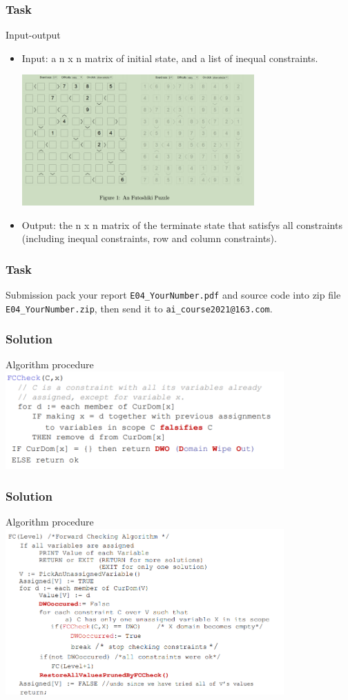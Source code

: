\documentclass{beamer}
\begin{document}
\begin{frame}
  \frametitle{Task}
  \begin{block}{Input-output}
    \begin{itemize}
      \item Input: a n x n matrix of initial state, and a list of inequal constraints.


	  \includegraphics[width=0.7\textwidth]{Pic/figure1}

      \item Output: the n x n matrix of the terminate state that satisfys all constraints (including inequal constraints, row and column constraints).
    \end{itemize}
  \end{block}
\end{frame}
\begin{frame}

  \frametitle{Task}
  \begin{block}{Submission}
    pack your report \texttt{E04\_YourNumber.pdf} and source code into zip file \texttt{E04\_YourNumber.zip}, then send it to \texttt{ai\_course2021@163.com}.
  \end{block}
\end{frame}

\begin{frame}
  \frametitle{Solution}
  Algorithm procedure
  \includegraphics[width=0.8\textwidth]{Pic/fc1}
\end{frame}

\begin{frame}
  \frametitle{Solution}
  Algorithm procedure
  \includegraphics[width=0.8\textwidth]{Pic/fc2}
\end{frame}
\end{document}
